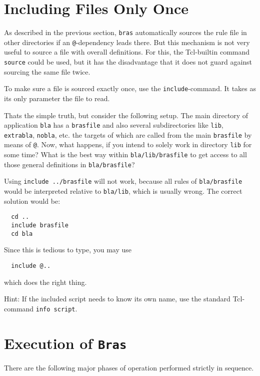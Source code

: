 \documentclass[12pt]{article}
\newcommand{\bras}{\texttt{bras}}
\newcommand{\Bras}{\texttt{Bras}}
\begin{document}
\section{Including Files Only Once}

As described in the previous section, \bras{} automatically sources
the rule file in other directories if an \texttt{@}-dependency leads
there. But this mechanism is not very useful to source a file with
overall definitions. For this, the Tcl-builtin command
\texttt{source} could be used, but it has the disadvantage that it
does not guard against sourcing the same file twice.

To make sure a file is sourced exactly once, use the
\texttt{include}-command. It takes as its only parameter the file to
read. 

Thats the simple truth, but consider the following setup. The main
directory of application \texttt{bla} has a \texttt{brasfile} and also
several subdirectories like \texttt{lib}, \texttt{extrabla},
\texttt{nobla}, etc. the targets of which are called from the main
\texttt{brasfile} by means of \texttt{@}. Now, what happens,
if you intend to solely work in directory \texttt{lib} for some time?
What is the best way within \texttt{bla/lib/brasfile} to get access to all
those general definitions in \texttt{bla/brasfile}?

Using \texttt{include ../brasfile} will not work, because all
rules of \texttt{bla/brasfile} would be interpreted relative to
\texttt{bla/lib}, which is usually wrong. The correct solution would
be:
\begin{verbatim}
  cd ..
  include brasfile
  cd bla
\end{verbatim}
Since this is tedious to type, you may use
\begin{verbatim}
  include @..
\end{verbatim}
which does the right thing.

Hint: If the included script needs to know its own name, use the
standard Tcl-command \texttt{info script}.

\section{Execution of \Bras}

There are the following major phases of operation performed strictly in
sequence.
\end{document}
